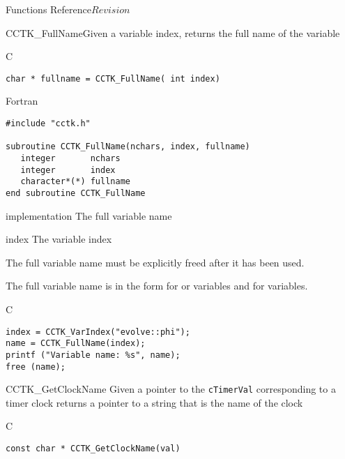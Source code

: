 \begin{cactuspart}{ Functions Reference}{}{$Revision$}
\begin{FunctionDescription}{CCTK\_FullName}{Given a variable index, returns the full name of the variable}
\label{CCTK-FullName}
\begin{SynopsisSection}
\begin{Synopsis}{C}
\begin{verbatim}char * fullname = CCTK_FullName( int index)\end{verbatim}
\end{Synopsis}
\begin{Synopsis}{Fortran}
\begin{verbatim}
#include "cctk.h"

subroutine CCTK_FullName(nchars, index, fullname)
   integer       nchars
   integer       index
   character*(*) fullname
end subroutine CCTK_FullName
\end{verbatim}
\end{Synopsis}
\end{SynopsisSection}
\begin{ParameterSection}
\begin{Parameter}{implementation}
The full variable name
\end{Parameter}
\begin{Parameter}{index}
The variable index
\end{Parameter}
\end{ParameterSection}
\begin{Discussion}
The full variable name must be explicitly freed after it has been used.

The full variable name is in the form  for
 or  variables and  for
 variables.
\end{Discussion}
\begin{ExampleSection}
\begin{Example}{C}
\begin{verbatim}
index = CCTK_VarIndex("evolve::phi");
name = CCTK_FullName(index);
printf ("Variable name: %s", name);
free (name);
\end{verbatim}
\end{Example}
\end{ExampleSection}
\end{FunctionDescription}






\begin{FunctionDescription}{CCTK\_GetClockName}
\label{CCTK-GetClockName}
Given a pointer to the {\tt cTimerVal}
corresponding to a timer clock returns a pointer to a string that is
the name of the clock
\begin{SynopsisSection}
\begin{Synopsis}{C}
\begin{verbatim}
const char * CCTK_GetClockName(val)
\end{verbatim}
\end{Synopsis}
\end{SynopsisSection}


\end{FunctionDescription}
\end{cactuspart}

